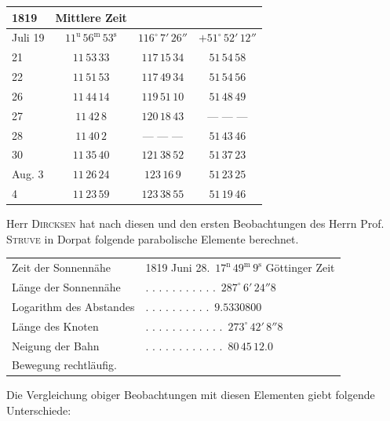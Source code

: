 \begin{center}
\begin{tabular}{l|c|c|c}
1819 & Mittlere Zeit & & \\
\hline
Juli 19 & $11^{\mathrm u}\,56^{\mathrm m}\,53^{\mathrm s}$ & $116^\circ\,7'\,26''$ & $+51^\circ\,52'\,12''$ \\
21 & $11\,53\,33$ & $117\,15\,34$ & $51\,54\,58$ \\
22 & $11\,51\,53$ & $117\,49\,34$ & $51\,54\,56$ \\
26 & $11\,44\,14$ & $119\,51\,10$ & $51\,48\,49$ \\
27 & $11\,42\,8$ & $120\,18\,43$ & --- --- --- \\
28 & $11\,40\,2$ & --- --- --- & $51\,43\,46$ \\
30 & $11\,35\,40$ & $121\,38\,52$ & $51\,37\,23$ \\
Aug. 3 & $11\,26\,24$ & $123\,16\,9$ & $51\,23\,25$ \\
4 & $11\,23\,59$ & $123\,38\,55$ & $51\,19\,46$ \\
\end{tabular}
\end{center}

\par\indent Herr \textsc{Dircksen} hat nach diesen und den ersten Beobachtungen des Herrn Prof. \textsc{Struve} in Dorpat folgende parabolische Elemente berechnet.

\begin{center}
\begin{tabular}{ll}
Zeit der Sonnennähe & 1819 Juni 28.\ $17^{\mathrm n}\,49^{\mathrm m}\,9^{\mathrm s}$ Göttinger Zeit \\
Länge der Sonnennähe & . . . . . . . . . . .\ $287^\circ\,6'\,24''8$ \\
Logarithm des Abstandes & . . . . . . . . . .\ $9.5330800$ \\
Länge des Knoten & . . . . . . . . . . . .\ $273^\circ\,42'\,8''8$ \\
Neigung der Bahn & . . . . . . . . . . . .\ $80\,45\,12.0$ \\
\multicolumn{2}{l}{Bewegung rechtläufig.}
\end{tabular}
\end{center}

\par\indent Die Vergleichung obiger Beobachtungen mit diesen Elementen giebt folgende Unterschiede:

